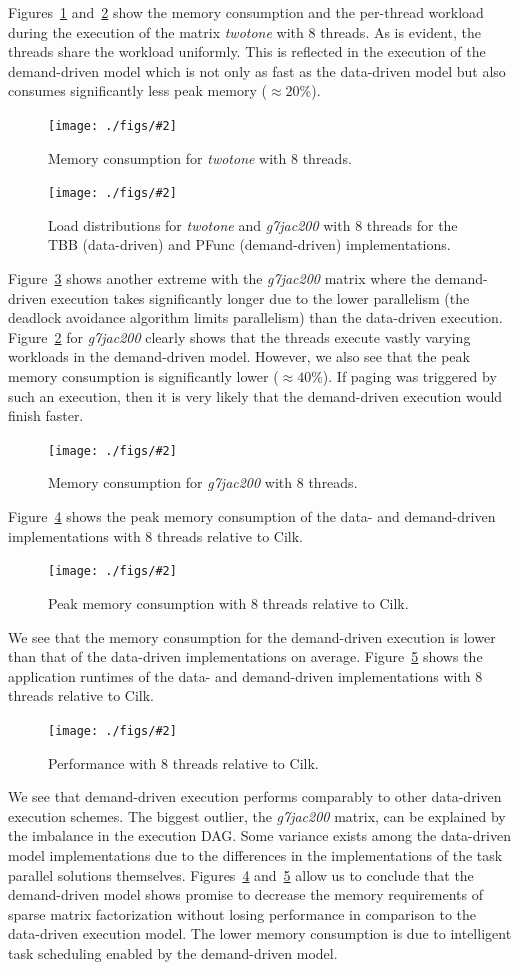 \documentclass[10pt,conference]{IEEEtran}
\newcommand{\insimgx}[3]{%
  \begin{figure}[!htbp]
  \begin{center}
    \texttt{[image: ./figs/\#2]}
    \caption{#3}
    \label{#2}
  \end{center}
  \end{figure}
}
\begin{document}
Figures~\ref{memory_twotone} and~\ref{load_balance} show the memory
consumption and the per-thread workload during the execution of the matrix
\emph{twotone} with 8 threads.  As is evident, the threads share the workload
uniformly.  This is reflected in the execution of the demand-driven model which
is not only as fast as the data-driven model but also consumes significantly
less peak memory ($\approx 20\%$).
%
\insimgx{\columnwidth}{memory_twotone}{Memory consumption for \emph{twotone}
with 8 threads.}
%
\insimgx{\columnwidth}{load_balance}{Load distributions for \emph{twotone} and
\emph{g7jac200} with 8 threads for the TBB (data-driven) and PFunc
(demand-driven) implementations.}
% 
Figure~\ref{memory_g7jac200} shows another extreme with the
\emph{g7jac200} matrix where the demand-driven
execution takes significantly longer due to the lower parallelism (the deadlock
avoidance algorithm limits parallelism) than the data-driven execution.
Figure~\ref{load_balance} for \textit{g7jac200} clearly shows that the
threads execute vastly varying workloads in the demand-driven model.  However,
we also see that the peak memory consumption is significantly lower ($\approx
40\%$). If paging was triggered by such an execution, then it is very likely
that the demand-driven execution would finish faster.

\insimgx{\columnwidth}{memory_g7jac200}{Memory consumption for 
\emph{g7jac200} with 8 threads.}


Figure~\ref{dag_memory} shows the peak memory consumption of the
data- and demand-driven implementations with 8 threads relative to Cilk. 
%
\insimgx{\columnwidth}{dag_memory}{Peak memory consumption with 8 threads
relative to Cilk.}
%
We see that the memory consumption for the demand-driven execution is lower
than that of the data-driven implementations on average. 
%
Figure~\ref{dag_speedup} shows the application runtimes of the
data- and demand-driven implementations with 8 threads relative to Cilk. 
%
\insimgx{\columnwidth}{dag_speedup}{Performance with 8
threads relative to Cilk.}
%
%
We see that demand-driven execution performs comparably to other data-driven
execution schemes. The biggest outlier, the \emph{g7jac200} matrix, can be
explained by the imbalance in the execution DAG.  Some variance exists among
the data-driven model implementations due to the differences in the
implementations of the task parallel solutions themselves.
Figures~\ref{dag_memory} and~\ref{dag_speedup} allow us to conclude
that the demand-driven model shows promise to decrease the memory requirements
of sparse matrix factorization without losing performance in comparison to
the data-driven execution model. The lower memory consumption is due
to intelligent task scheduling enabled by the demand-driven model.
\end{document}
